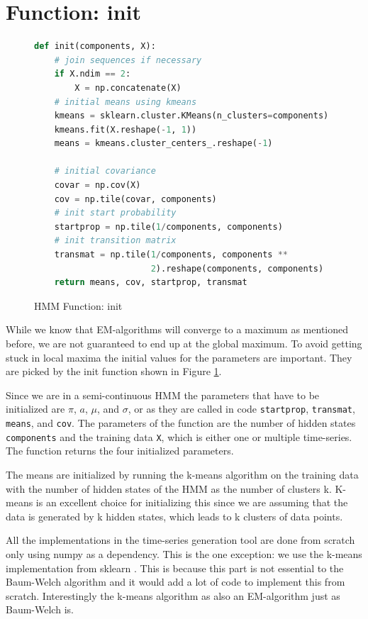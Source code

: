 \section{Function: init}

\begin{figure}
\begin{singlespace}
\begin{lstlisting}[language=Python]
def init(components, X):
    # join sequences if necessary
    if X.ndim == 2:
        X = np.concatenate(X)
    # initial means using kmeans
    kmeans = sklearn.cluster.KMeans(n_clusters=components)
    kmeans.fit(X.reshape(-1, 1))
    means = kmeans.cluster_centers_.reshape(-1)

    # initial covariance
    covar = np.cov(X)
    cov = np.tile(covar, components)
    # init start probability
    startprop = np.tile(1/components, components)
    # init transition matrix
    transmat = np.tile(1/components, components **
                       2).reshape(components, components)
    return means, cov, startprop, transmat
\end{lstlisting}
\end{singlespace}
   
\caption{HMM Function: init}    
\label{fig:hmm-init-listing}
\end{figure}

While we know that EM-algorithms will converge to a maximum as mentioned before, we are not guaranteed to end up at the global maximum. To avoid getting stuck in local maxima the initial values for the parameters are important. They are picked by the init function shown in Figure \ref{fig:hmm-init-listing}.

Since we are in a semi-continuous HMM the parameters that have to be initialized are $\pi$, $a$, $\mu$, and $\sigma$, or as they are called in code \texttt{startprop}, \texttt{transmat}, \texttt{means}, and \texttt{cov}. The parameters of the function are the number of hidden states \texttt{components} and the training data \texttt{X}, which is either one or multiple time-series. The function returns the four initialized parameters. 

The means are initialized by running the k-means algorithm on the training data with the number of hidden states of the HMM as the number of clusters k. K-means is an excellent choice for initializing this since we are assuming that the data is generated by k hidden states, which leads to k clusters of data points. 

All the implementations in the time-series generation tool are done from scratch only using numpy as a dependency. This is the one exception: we use the k-means implementation from sklearn \parencite{pedregosa2011scikit}.  This is because this part is not essential to the Baum-Welch algorithm and it would add a lot of code to implement this from scratch. Interestingly the k-means algorithm as also an EM-algorithm just as Baum-Welch is. 

